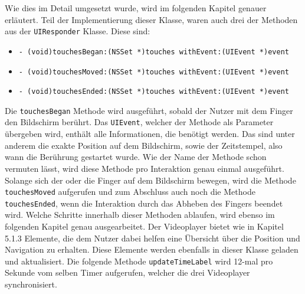 \documentclass[11pt,a4paper]{report}
\begin{document}
Wie dies im Detail umgesetzt wurde, wird im folgenden Kapitel genauer erläutert. Teil der Implementierung dieser Klasse, waren auch drei der Methoden aus der \texttt{UIResponder} Klasse. Diese sind:
\begin{itemize}
\item \texttt{- (void)touchesBegan:(NSSet *)touches withEvent:(UIEvent *)event}
\item \texttt{- (void)touchesMoved:(NSSet *)touches withEvent:(UIEvent *)event}
\item \texttt{- (void)touchesEnded:(NSSet *)touches withEvent:(UIEvent *)event}
\end{itemize}
Die \texttt{touchesBegan} Methode wird ausgeführt, sobald der Nutzer mit dem Finger den Bildschirm berührt. Das \texttt{UIEvent}, welcher der Methode als Parameter übergeben wird, enthält alle Informationen, die benötigt werden. Das sind unter anderem die exakte Position auf dem Bildschirm, sowie der Zeitstempel, also wann die Berührung gestartet wurde. Wie der Name der Methode schon vermuten lässt, wird diese Methode pro Interaktion genau einmal ausgeführt. Solange sich der oder die Finger auf dem Bildschirm bewegen, wird die Methode \texttt{touchesMoved} aufgerufen und zum Abschluss auch noch die Methode \texttt{touchesEnded}, wenn die Interaktion durch das Abheben des Fingers beendet wird. Welche Schritte innerhalb dieser Methoden ablaufen, wird ebenso im folgenden Kapitel genau ausgearbeitet. Der Videoplayer bietet wie in Kapitel 5.1.3 Elemente, die dem Nutzer dabei helfen eine Übersicht über die Position und Navigation zu erhalten. Diese Elemente werden ebenfalls in dieser Klasse geladen und aktualisiert. Die folgende Methode \texttt{updateTimeLabel} wird 12-mal pro Sekunde vom selben Timer aufgerufen, welcher die drei Videoplayer synchronisiert.
\end{document}
